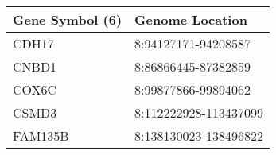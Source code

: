 \begin{tabular}{ll}
\toprule
Gene Symbol (6) &       Genome Location \\
\midrule
          CDH17 &   8:94127171-94208587 \\
          CNBD1 &   8:86866445-87382859 \\
          COX6C &   8:99877866-99894062 \\
          CSMD3 & 8:112222928-113437099 \\
        FAM135B & 8:138130023-138496822 \\
\bottomrule
\end{tabular}
